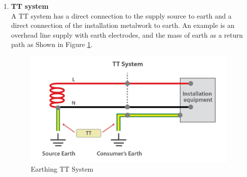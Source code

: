 \documentclass[12pt,fleqn]{book} %
\begin{document}
\begin{enumerate}
    \item \textbf{TT system}
   \\ A TT system has a direct connection to the supply source to earth and a direct connection of the installation metalwork to earth. An example is an overhead line supply with earth electrodes, and the mass of earth as a return path as Shown in Figure \ref{fig:earth 3}.
    \begin{figure}[!h]
    \centering
    \includegraphics[width=0.8\linewidth]{earth 3.png}
    \caption{Earthing TT System}
    \label{fig:earth 3}
\end{figure}


\end{enumerate}
\end{document}
